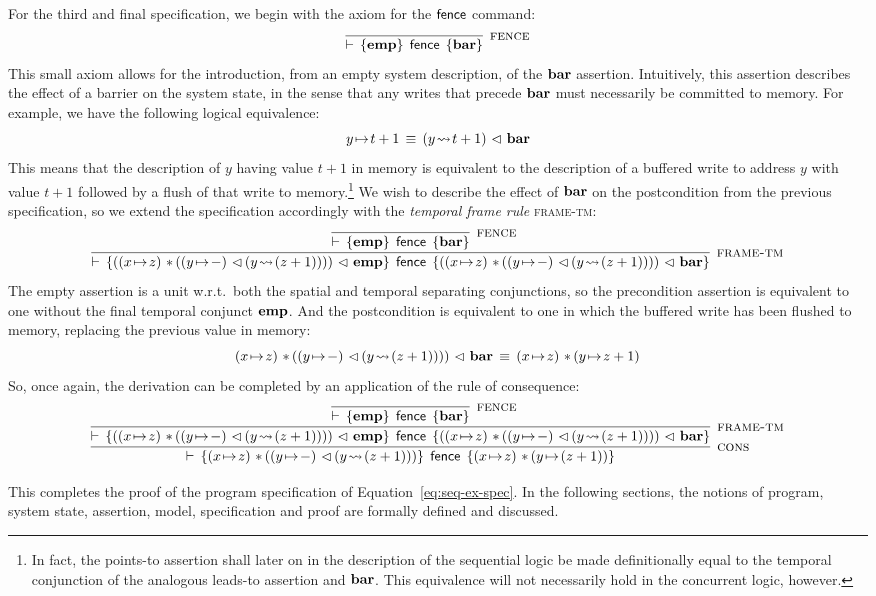 \documentclass[11pt]{report}
\begin{document}
For the third and final specification, we begin with the axiom for the $\operatorname{\mathsf{fence}}$ command: \[ \infer[\textsc{fence}]{\triple{\femp}{\cfence}{\fbaru}}{}\] This small axiom allows for the introduction, from an empty system description, of the $\mathbf{bar}$ assertion. Intuitively, this assertion describes the effect of a barrier on the system state, in the sense that any writes that precede $\mathbf{bar}$ must necessarily be committed to memory. For example, we have the following logical equivalence: \[ y \!\mapsto\! t+1 \,\equiv\, (y \!\leadsto\! t+1) \operatorname{\,\vartriangleleft\,} \mathbf{bar} \] This means that the description of $y$ having value $t+1$ in memory is equivalent to the description of a buffered write to address $y$ with value $t+1$ followed by a flush of that write to memory.\footnote{In fact, the points-to assertion shall later on in the description of the sequential logic be made definitionally equal to the temporal conjunction of the analogous leads-to assertion and $\mathbf{bar}$. This equivalence will not necessarily hold in the concurrent logic, however.} We wish to describe the effect of $\mathbf{bar}$ on the postcondition from the previous specification, so we extend the specification accordingly with the \emph{temporal frame rule} \textsc{frame-tm}: 
\[ \infer[\textsc{frame-tm}]{\triple{((x \fpointsto z) \fsep ((y \fpointsto -) \fseq (y \fwriteu (z+1)))) \fseq \femp}{\cfence}{((x \fpointsto z) \fsep ((y \fpointsto -) \fseq (y \fwriteu (z+1)))) \fseq \fbaru}}{
\infer[\textsc{fence}]{\triple{\femp}{\cfence}{\fbaru}}{}}
\] The empty assertion is a unit w.r.t.\ both the spatial and temporal separating conjunctions, so the precondition assertion is equivalent to one without the final temporal conjunct $\mathbf{emp}$. And the postcondition is equivalent to one in which the buffered write has been flushed to memory, replacing the previous value in memory: \[ (x \fpointsto z) \fsep ((y \fpointsto -) \fseq (y \fwriteu (z+1)))) \fseq \fbaru \sequiv (x \fpointsto z) \fsep (y \fpointsto z+1)\] So, once again, the derivation can be completed by an application of the rule of consequence: \[ \infer[\textsc{cons}]{\triple{(x \fpointsto z) \fsep ((y \fpointsto -) \fseq (y \fwriteu (z+1)))}{\cfence}{(x \fpointsto z) \fsep (y \fpointsto (z+1))}}{\infer[\textsc{frame-tm}]{\triple{((x \fpointsto z) \fsep ((y \fpointsto -) \fseq (y \fwriteu (z+1)))) \fseq \femp}{\cfence}{((x \fpointsto z) \fsep ((y \fpointsto -) \fseq (y \fwriteu (z+1)))) \fseq \fbaru}}{
\infer[\textsc{fence}]{\triple{\femp}{\cfence}{\fbaru}}{}}}\]

This completes the proof of the program specification of Equation~\ref{eq:seq-ex-spec}. In the following sections, the notions of program, system state, assertion, model, specification and proof are formally defined and discussed.
\end{document}
